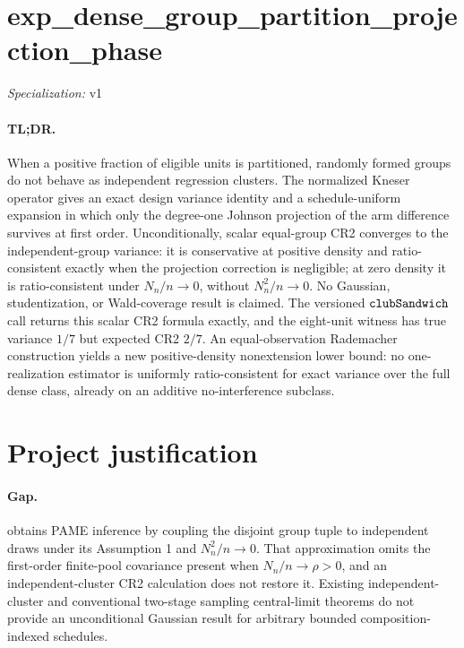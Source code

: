 \documentclass{article}
\begin{document}
\sloppy

\section*{exp\_\allowbreak{}dense\_\allowbreak{}group\_\allowbreak{}partition\_\allowbreak{}projection\_\allowbreak{}phase}

\noindent\textit{Specialization:} v1\par

\paragraph{TL;DR.} When a positive fraction of eligible units is partitioned, randomly formed groups do not behave as independent regression clusters. The normalized Kneser operator gives an exact design variance identity and a schedule-uniform expansion in which only the degree-one Johnson projection of the arm difference survives at first order. Unconditionally, scalar equal-group CR2 converges to the independent-group variance: it is conservative at positive density and ratio-consistent exactly when the projection correction is negligible; at zero density it is ratio-consistent under \(N_n/n\to0\), without \(N_n^2/n\to0\). No Gaussian, studentization, or Wald-coverage result is claimed. The versioned \({\tt clubSandwich}\) call returns this scalar CR2 formula exactly, and the eight-unit witness has true variance \(1/7\) but expected CR2 \(2/7\). An equal-observation Rademacher construction yields a new positive-density nonextension lower bound: no one-realization estimator is uniformly ratio-consistent for exact variance over the full dense class, already on an additive no-interference subclass.

\section{Project justification}

\paragraph{Gap.} \cite{FuSamiiWang2026} obtains PAME inference by coupling the disjoint group tuple to independent draws under its Assumption 1 and \(N_n^2/n\to0\). That approximation omits the first-order finite-pool covariance present when \(N_n/n\to\rho>0\), and an independent-cluster CR2 calculation does not restore it. Existing independent-cluster and conventional two-stage sampling central-limit theorems do not provide an unconditional Gaussian result for arbitrary bounded composition-indexed schedules.
\end{document}
